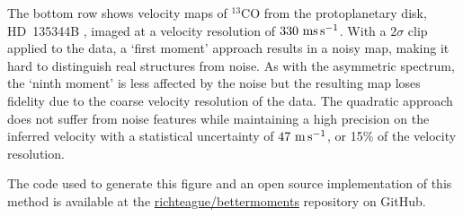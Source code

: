 \documentclass[rnaas]{aastex62}
\begin{document}
The bottom row shows velocity maps of $^{13}$CO from the protoplanetary disk, HD~135344B \citep[ALMA Project 2012.1.00158.S]{vanderMarel:2016}, imaged at a velocity resolution of $330~{\rm ms\,s^{-1}}$. With a $2\sigma$ clip applied to the data, a `first moment' approach results in a noisy map, making it hard to distinguish real structures from noise. As with the asymmetric spectrum, the `ninth moment' is less affected by the noise but the resulting map loses fidelity due to the coarse velocity resolution of the data. The quadratic approach does not suffer from noise features while maintaining a high precision on the inferred velocity with a statistical uncertainty of $47~{\rm m\,s^{-1}}$, or 15\% of the velocity resolution.

The code used to generate this figure and an open source implementation of this method is available at the \href{https://github.com/richteague/bettermoments}{richteague/bettermoments} repository on GitHub.


\end{document}
